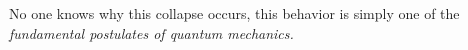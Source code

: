 \documentclass[preview]{standalone}
\begin{document}
\begin{center}
No one knows why this collapse occurs, this behavior is simply one of the \textit{fundamental postulates of quantum mechanics.}
\end{center}
\end{document}
